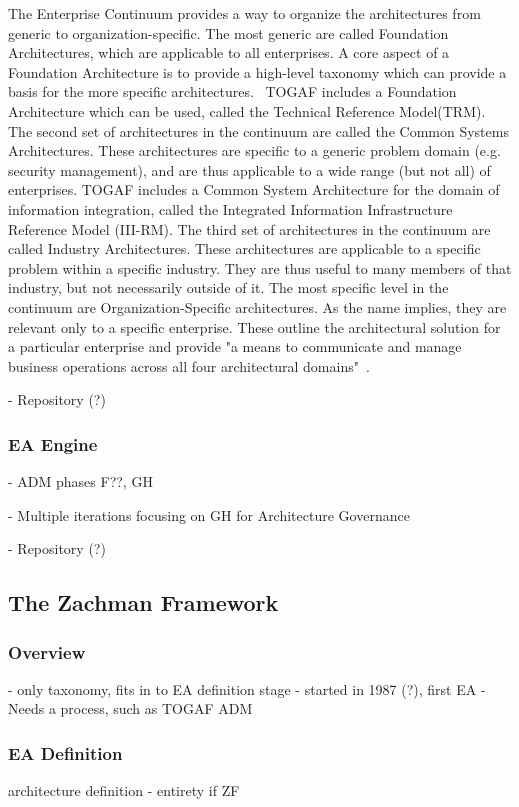 The Enterprise Continuum provides a way to organize the architectures from generic to organization-specific. The most generic are called Foundation Architectures, which are applicable to all enterprises. A core aspect of a Foundation Architecture is to provide a high-level taxonomy which can provide a basis for the more specific architectures.~\cite{togaf9.1} TOGAF includes a Foundation Architecture which can be used, called the Technical Reference Model(TRM). The second set of architectures in the continuum are called the Common Systems Architectures. These architectures are specific to a generic problem domain (e.g. security management), and are thus applicable to a wide range (but not all) of enterprises. TOGAF includes a Common System Architecture for the domain of information integration, called the Integrated Information Infrastructure Reference Model (III-RM). The third set of architectures in the continuum are called Industry Architectures. These architectures are applicable to a specific problem within a specific industry. They are thus useful to many members of that industry, but not necessarily outside of it. The most specific level in the continuum are Organization-Specific  architectures. As the name implies, they are relevant only to a specific enterprise. These outline the architectural solution for a particular enterprise and provide "a means to communicate and manage business operations across all four architectural domains"~\cite{togaf9.1}.

- Repository (?)


\subsubsection{EA Engine}
- ADM phases F??, GH

- Multiple iterations focusing on GH for Architecture Governance

- Repository (?)


\subsection{The Zachman Framework}
\subsubsection{Overview}
- only taxonomy, fits in to EA definition stage
- started in 1987 (?), first EA
- Needs a process, such as TOGAF ADM

\subsubsection{EA Definition}
architecture definition
- entirety if ZF


